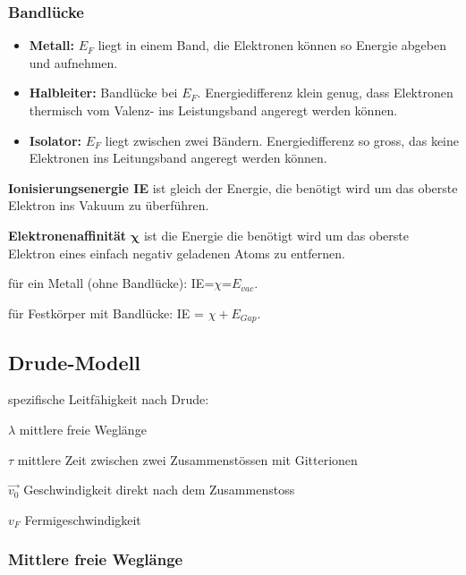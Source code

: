 \documentclass[10pt,a4paper]{scrartcl}
\begin{document}
\begin{multicols*}{3}
	\subsubsection*{Bandlücke}
	
	\begin{itemize}
	\compaq
	\item
	\textbf{Metall:} $E_F$ liegt in einem Band, die Elektronen können so Energie abgeben und aufnehmen.
	\item
	\textbf{Halbleiter:} Bandlücke bei $E_F$. Energiedifferenz klein genug, dass Elektronen thermisch vom Valenz- ins Leistungsband angeregt werden können.
	\item
	\textbf{Isolator:} $E_F$ liegt zwischen zwei Bändern. Energiedifferenz so gross, das keine Elektronen ins Leitungsband angeregt werden können.
	\end{itemize}	
	
	
	\textbf{Ionisierungsenergie IE} ist gleich der Energie, die benötigt wird um das oberste Elektron ins Vakuum zu überführen.
	
	\textbf{Elektronenaffinität} $\mathbf{\chi}$ ist die Energie die benötigt wird um das oberste Elektron eines einfach negativ geladenen Atoms zu entfernen.
	
	für ein Metall (ohne Bandlücke): IE=$\chi$=$E_{vac}$.
	
	für Festkörper mit Bandlücke: IE = $\chi+E_{Gap}$.
	
	\subsection{Drude-Modell}
	
	spezifische Leitfähigkeit nach Drude:	
	
	
	\footnotesize
	$\lambda$ mittlere freie Weglänge	
	
	$\tau$ mittlere Zeit zwischen zwei Zusammenstössen mit Gitterionen
	
	$\vec{v_0}$ Geschwindigkeit direkt nach dem Zusammenstoss
	
	$v_F$ Fermigeschwindigkeit
	\normalsize
	
	\subsubsection{Mittlere freie Weglänge}	
	

\end{multicols*}
\end{document}
